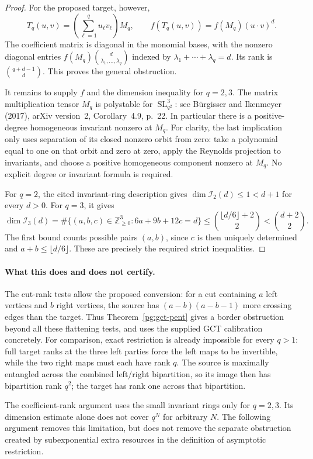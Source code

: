 \begin{proof}
For the proposed target, however,
\[
 T_q(u,v)=\left(\sum_{\ell=1}^q u_\ell v_\ell\right)M_q,
 \qquad
 f(T_q(u,v))=f(M_q)(u\mathbin{\cdot}v)^d.
\]
The coefficient matrix is diagonal in the monomial bases, with the
nonzero diagonal entries
$f(M_q)\binom d{\lambda_1,\ldots,\lambda_q}$ indexed by
$\lambda_1+\cdots+\lambda_q=d$. Its rank is
$\binom{q+d-1}{d}$. This proves the general obstruction.

It remains to supply $f$ and the dimension inequality for $q=2,3$.
The matrix multiplication tensor $M_q$ is polystable for
$\operatorname{SL}_{q^2}^3$: see B\"urgisser and Ikenmeyer (2017),
arXiv version~2, Corollary~4.9, p.~22. In particular there is a
positive-degree homogeneous invariant nonzero at $M_q$.
For clarity, the last implication only uses separation of its closed
nonzero orbit from zero: take a polynomial equal to one on that orbit
and zero at zero, apply the Reynolds projection to invariants, and
choose a positive homogeneous component nonzero at $M_q$.
No explicit degree or invariant formula is required.

For $q=2$, the cited invariant-ring description gives
$\dim\mathcal I_2(d)\leq1<d+1$ for every $d>0$.
For $q=3$, it gives
\[
 \dim\mathcal I_3(d)
 =\#\{(a,b,c)\in\mathbb Z_{\geq0}^3:6a+9b+12c=d\}
 \leq\binom{\lfloor d/6\rfloor+2}{2}
 <\binom{d+2}{2}.
\]
The first bound counts possible pairs $(a,b)$, since $c$ is then
uniquely determined and $a+b\leq\lfloor d/6\rfloor$.
These are precisely the required strict inequalities.
\end{proof}

\paragraph{What this does and does not certify.}
The cut-rank tests allow the proposed conversion: for a cut containing
$a$ left vertices and $b$ right vertices, the source has
$(a-b)(a-b-1)$ more crossing edges than the target. Thus
Theorem~\ref{pg:gct-pent} gives a border obstruction beyond all these
flattening tests, and uses the supplied GCT calibration concretely.
For comparison, exact restriction is already impossible for every
$q>1$: full target ranks at the three left parties force the left
maps to be invertible, while the two right maps must each have rank
$q$. The source is maximally entangled across the combined left/right
bipartition, so its image then has bipartition rank $q^2$; the target
has rank one across that bipartition.

The coefficient-rank argument uses the small invariant rings only for
$q=2,3$. Its dimension estimate alone does not cover $q^N$ for arbitrary
$N$. The following argument removes this limitation, but does not
remove the separate obstruction created by subexponential extra
resources in the definition of asymptotic restriction.

